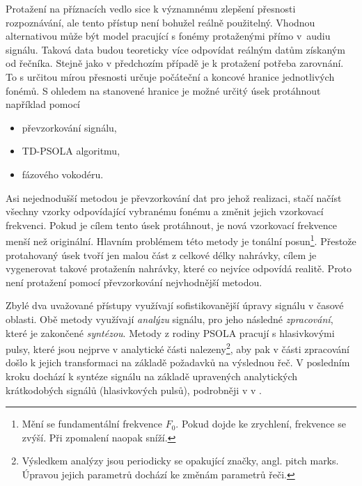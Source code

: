 Protažení na příznacích vedlo sice k významnému zlepšení přesnosti rozpoznávání, ale tento přístup není bohužel reálně použitelný. Vhodnou alternativou může být model pracující s fonémy protaženými přímo v~audiu signálu.
Taková data budou teoreticky více odpovídat reálným datům získaným od řečníka.
Stejně jako v předchozím případě je k protažení potřeba zarovnání.
To s určitou mírou přesnosti určuje počáteční a koncové hranice jednotlivých fonémů.
S ohledem na stanovené hranice je možné určitý úsek protáhnout například pomocí

\begin{itemize}
  \item převzorkování signálu,
  \item TD-PSOLA algoritmu,
  \item fázového vokodéru.
\end{itemize}

\noindent Asi nejednodušší metodou je převzorkování dat pro jehož realizaci, stačí načíst všechny vzorky odpovídající vybranému fonému a změnit jejich vzorkovací frekvenci.
Pokud je cílem tento úsek protáhnout, je nová vzorkovací frekvence menší než originální. Hlavním problémem této metody je tonální posun\footnote{Mění se fundamentální frekvence $F_0$. Pokud dojde ke zrychlení, frekvence se zvýší. Při zpomalení naopak sníží.}.
Přestože protahovaný úsek tvoří jen malou část z celkové délky nahrávky, cílem je vygenerovat takové protaženín nahrávky, které co nejvíce odpovídá realitě.
Proto není protažení pomocí převzorkování nejvhodnější metodou.

Zbylé dva uvažované přístupy využívají sofistikovanější úpravy signálu v časové oblasti.
Obě metody využívají \textit{analýzu} signálu, pro jeho následné \textit{zpracování}, které je zakončené \textit{syntézou}.
Metody z rodiny PSOLA pracují s hlasivkovými pulsy, které jsou nejprve v analytické části nalezeny\footnote{Výsledkem analýzy jsou periodicky se opakující značky, angl. pitch marks. Úpravou jejich parametrů dochází ke změnám parametrů řeči.}, aby pak v části zpracování došlo k jejich transformaci na základě požadavků na výslednou řeč.
V posledním kroku dochází k syntéze signálu na základě upravených analytických krátkodobých signálů (hlasivkových pulsů), podrobněji v v \cite{Psutka2006}.

